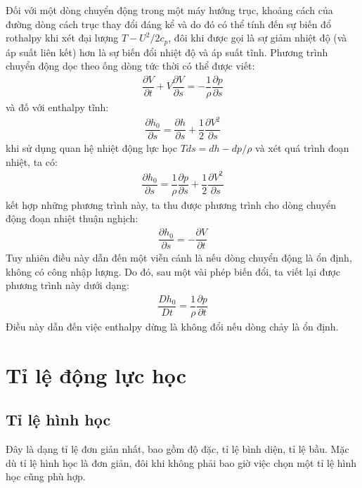 \documentclass[MAY_THUY_KHI.tex]{subfiles}
\begin{document}
        Đối với một dòng chuyển động trong một máy hướng trục, khoảng cách của đường dòng cách trục thay đổi đáng kể và do đó có thể tính đến sự biến đổ rothalpy khi xét đại lượng $T-U^2/2c_p$, đôi khi được gọi là sự giảm nhiệt độ (và áp suất liên kết) hơn là sự biến đổi nhiệt độ và áp suất tĩnh. Phương trình chuyển động dọc theo ống dòng tức thời có thể được viết:
            \begin{align}
                \dfrac{\partial V}{\partial t}+V\dfrac{\partial V}{\partial s}=-\dfrac{1}{\rho}\dfrac{\partial p}{\partial s}
            \end{align}
        và đố với enthalpy tĩnh:
            \begin{align}
                \dfrac{\partial h_0}{\partial s}=\dfrac{\partial h}{\partial s}+\dfrac{1}{2}\dfrac{\partial V^2}{\partial s}
            \end{align}
        khi sử dụng quan hệ nhiệt động lực học $Tds=dh-dp/\rho$ và xét quá trình đoạn nhiệt, ta có:
            \begin{align}
                \dfrac{\partial h_0}{\partial s}=\dfrac{1}{\rho}\dfrac{\partial p}{\partial s}+\dfrac{1}{2}\dfrac{\partial V^2}{\partial s}
            \end{align}
        kết hợp những phương trình này, ta thu được phương trình cho dòng chuyển động đoạn nhiệt thuận nghịch:
            \begin{align}
                \dfrac{\partial h_0}{\partial s}=-\dfrac{\partial V}{\partial t}
            \end{align}
        Tuy nhiên điều này dẫn đến một viễn cánh là nếu dòng chuyển động là ổn định, không có công nhập lượng. Do đó, sau một vài phép biến đổi, ta viết lại được phương trình này dưới dạng:
            \begin{align}
                \dfrac{Dh_0}{Dt}=\dfrac{1}{\rho}\dfrac{\partial p}{\partial t}
            \end{align}
        Điều này dẫn đến việc enthalpy dừng là không đổi nếu dòng chảy là ổn định.
\section{Tỉ lệ động lực học}
\subsection{Tỉ lệ hình học}
        Đây là dạng tỉ lệ đơn giản nhất, bao gồm độ đặc, tỉ lệ bình diện, tỉ lệ bầu. Mặc dù tỉ lệ hình học là đơn giản, đôi khi không phải bao giờ việc chọn một tỉ lệ hình học cũng phù hợp.
\end{document}
